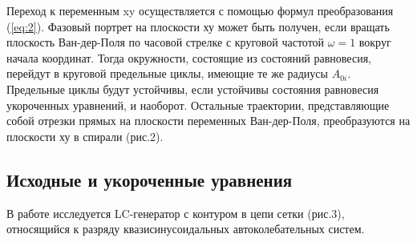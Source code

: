 \begin{center}
\begin{minipage}{0.49\linewidth}
        \vspace{-50pt}
        \label{fig:2}
    \end{minipage} 
\end{center} 

Переход к переменным xy осуществляется с помощью формул преобразования  (\ref{eq:2}). Фазовый портрет на плоскости ху может быть получен, если вращать плоскость Ван-дер-Поля по часовой стрелке с круговой частотой $\omega=1$ вокруг начала координат. Тогда окружности, состоящие из состояний равновесия, перейдут в круговой предельные циклы, имеющие те же радиусы $A_{0i}$. Предельные циклы будут устойчивы, если устойчивы состояния равновесия укороченных уравнений, и наоборот. Остальные траектории, представляющие собой отрезки прямых на плоскости переменных Ван-дер-Поля, преобразуются на плоскости ху в спирали (рис.2).

\subsection{Исходные и укороченные уравнения}

В работе исследуется LC-генератор с контуром в цепи сетки (рис.3), относящийся к разряду квазисинусоидальных автоколебательных систем.

